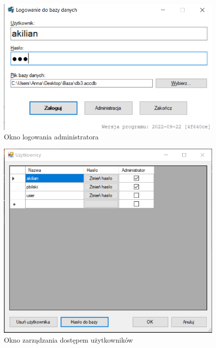 \begin{figure}[htb]
	\centering
	\includegraphics{obrazki/Logowanie/logowanie_administracja.png}
	\caption{Okno logowania administratora}
	\label{oknoLogowaniaAdmina}
\end{figure}

\begin{figure}[htb]
	\centering
	\includegraphics{obrazki/Logowanie/administracja.png}
	\caption{Okno zarządzania dostępem użytkowników}
	\label{administracja}
\end{figure}

